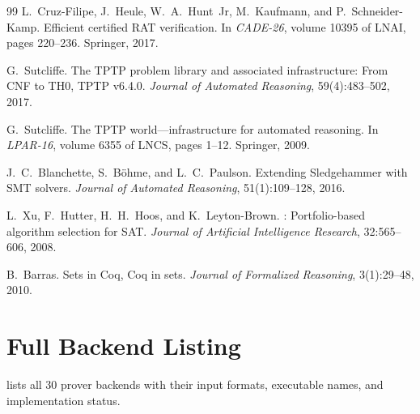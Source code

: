 \documentclass[11pt,a4paper]{article}
\begin{document}
\begin{thebibliography}{99}
L.~Cruz-Filipe, J.~Heule, W.~A.~Hunt~Jr, M.~Kaufmann, and P.~Schneider-Kamp.
\newblock Efficient certified {RAT} verification.
\newblock In \emph{CADE-26}, volume 10395 of LNAI, pages 220--236. Springer, 2017.

G.~Sutcliffe.
\newblock The {TPTP} problem library and associated infrastructure: From {CNF} to {TH0}, {TPTP} v6.4.0.
\newblock \emph{Journal of Automated Reasoning}, 59(4):483--502, 2017.

G.~Sutcliffe.
\newblock The {TPTP} world---infrastructure for automated reasoning.
\newblock In \emph{LPAR-16}, volume 6355 of LNCS, pages 1--12. Springer, 2009.

J.~C.~Blanchette, S.~B{\"o}hme, and L.~C.~Paulson.
\newblock Extending {Sledgehammer} with {SMT} solvers.
\newblock \emph{Journal of Automated Reasoning}, 51(1):109--128, 2016.

L.~Xu, F.~Hutter, H.~H.~Hoos, and K.~Leyton-Brown.
: Portfolio-based algorithm selection for {SAT}.
\newblock \emph{Journal of Artificial Intelligence Research}, 32:565--606, 2008.

B.~Barras.
\newblock Sets in {Coq}, {Coq} in sets.
\newblock \emph{Journal of Formalized Reasoning}, 3(1):29--48, 2010.

\end{thebibliography}


\appendix

\section{Full Backend Listing}
\label{app:backends}

 lists all 30 prover backends with their input formats,
executable names, and implementation status.
\end{document}
